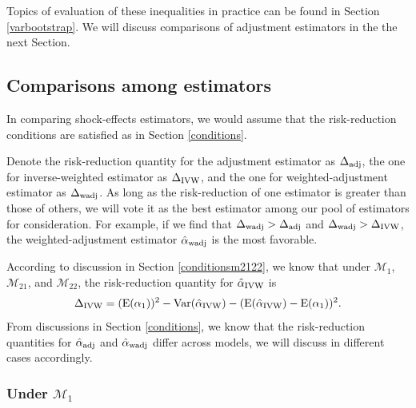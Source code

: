 \documentclass[11pt]{article}
\def\mc#1{\mathcal{#1}} %
\def\E#1{\mathrm{E}(#1)} %
\def\var#1{\mathrm{Var}(#1)} %
\theoremstyle{definition}
\begin{document}
Topics of  evaluation of these inequalities in practice can be found in Section \ref{varbootstrap}. 
We will discuss comparisons of adjustment estimators in the the next Section.



 

\subsection{Comparisons among estimators}

\label{comparisons}

In comparing  shock-effects estimators, we would assume that the risk-reduction conditions are satisfied as in Section \ref{conditions}.  

Denote the risk-reduction quantity for the adjustment estimator as $\Delta_{\rm adj}$, the one for inverse-weighted estimator as $\Delta_{\rm IVW}$, and the one for weighted-adjustment estimator as $\Delta_{\rm wadj}$. As long as the risk-reduction of one estimator is greater than those of others, we will vote it as the best estimator among our pool of estimators for consideration. For example, if we find that $\Delta_{\rm wadj}>\Delta_{\rm adj}$ and $\Delta_{\rm wadj}>\Delta_{\rm IVW}$, the weighted-adjustment estimator $\hat{\alpha}_{\rm wadj}$ is the most favorable.


According to  discussion in Section \ref{conditionsm2122}, we know that under $\mc{M}_{1}$, $\mc{M}_{21}$, and $\mc{M}_{22}$, the risk-reduction quantity for $\hat{\alpha}_{\rm IVW}$ is
\begin{align*}
  \Delta_{\rm IVW} = (\E{\alpha_1})^2- \var{\hat{\alpha}_{\rm IVW}} -(\E{\hat{\alpha}_{\rm IVW}}-\E{\alpha_1})^2.
\end{align*}
From discussions in Section \ref{conditions}, we know that the risk-reduction quantities for $\hat{\alpha}_{\rm adj}$ and $\hat{\alpha}_{\rm wadj}$ differ across models, we will discuss in different cases accordingly.


\subsubsection{Under $\mc{M}_{1}$}
\end{document}
